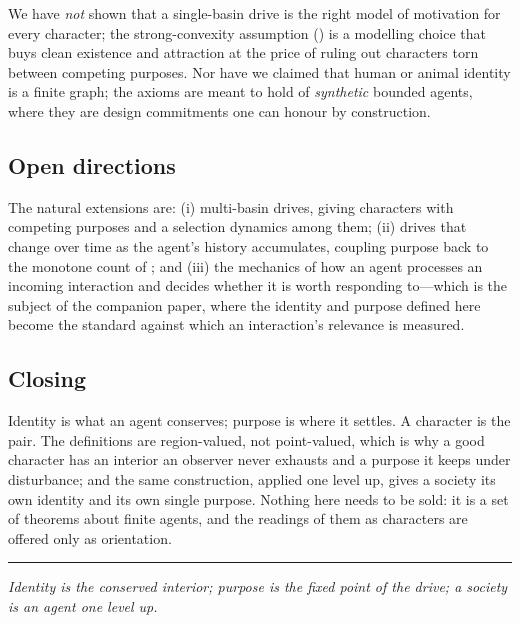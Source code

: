 \documentclass[11pt,twocolumn,a4paper]{article}
\begin{document}
We have \emph{not} shown that a single-basin drive is the right model of
motivation for every character; the strong-convexity assumption
() is a modelling choice that buys clean existence and
attraction at the price of ruling out characters torn between competing
purposes. Nor have we claimed that human or animal identity is a finite
graph; the axioms are meant to hold of \emph{synthetic} bounded agents,
where they are design commitments one can honour by construction.

\subsection{Open directions}

The natural extensions are: (i) multi-basin drives, giving characters with
competing purposes and a selection dynamics among them; (ii) drives that
change over time as the agent's history accumulates, coupling purpose back
to the monotone count of ; and (iii) the mechanics of
how an agent processes an incoming interaction and decides whether it is
worth responding to---which is the subject of the companion paper, where
the identity and purpose defined here become the standard against which an
interaction's relevance is measured.

\subsection{Closing}

Identity is what an agent conserves; purpose is where it settles. A
character is the pair. The definitions are region-valued, not
point-valued, which is why a good character has an interior an observer
never exhausts and a purpose it keeps under disturbance; and the same
construction, applied one level up, gives a society its own identity and
its own single purpose. Nothing here needs to be sold: it is a set of
theorems about finite agents, and the readings of them as characters are
offered only as orientation.

\vspace{0.6em}
\hrule
\vspace{0.4em}
\noindent\emph{Identity is the conserved interior; purpose is the fixed
point of the drive; a society is an agent one level up.}



\end{document}
